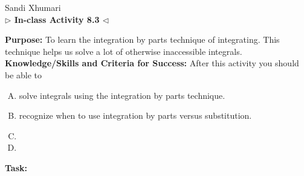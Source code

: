 \documentclass[answers]{exam}
\begin{document}
	\begin{center}
	\hfill Sandi Xhumari \\ \textbf{$\triangleright$ In-class Activity 8.3 $\triangleleft$}\\
\end{center}

\textbf{Purpose:} To learn the integration by parts technique of integrating. This technique helps us solve a lot of otherwise inaccessible integrals. \\

\textbf{Knowledge/Skills and Criteria for Success:} After this activity you should be able to

\begin{enumerate}[A.]
	\item solve integrals using the integration by parts technique.
	\item recognize when to use integration by parts versus substitution.
	\item
	\item
	
\end{enumerate}

\textbf{Task:}
\end{document}
